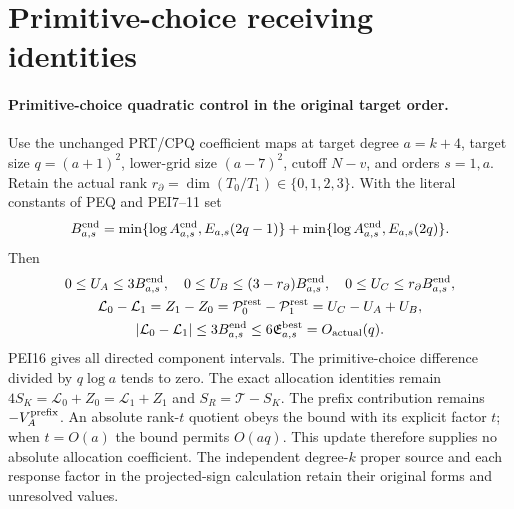 \documentclass[11pt,a4paper]{article}
\begin{document}
\endgroup

\clearpage
\begingroup


\setcounter{equation}{0}
\renewcommand{\theequation}{PEQR.\arabic{equation}}
\section*{Primitive-choice receiving identities}
\paragraph{Primitive-choice quadratic control in the original target order.}
Use the unchanged PRT/CPQ coefficient maps at target degree $a=k+4$,
target size $q=(a+1)^2$, lower-grid size $(a-7)^2$, cutoff $N-v$,
and orders $s=1,a$. Retain the actual rank
$r_\partial=\dim(T_0/T_1)\in\{0,1,2,3\}$.
With the literal constants of PEQ and PEI7--11 set
\[
 B^{\rm end}_{a,s}=
 \min\{\log A^{\rm end}_{a,s},E_{a,s}(2q-1)\}
 +\min\{\log A^{\rm end}_{a,s},E_{a,s}(2q)\}.
\]
Then
\[
 \begin{gathered}
 0\le U_A\le3B^{\rm end}_{a,s},\quad
 0\le U_B\le(3-r_\partial)B^{\rm end}_{a,s},\quad
 0\le U_C\le r_\partial B^{\rm end}_{a,s},\\
 \mathcal L_0-\mathcal L_1=Z_1-Z_0
     =\mathcal P^{\rm rest}_0-\mathcal P^{\rm rest}_1
     =U_C-U_A+U_B,\\
 |\mathcal L_0-\mathcal L_1|
 \le3B^{\rm end}_{a,s}\le6\mathfrak E^{\rm best}_{a,s}
       =O_{\rm actual}(q).
 \end{gathered}
\]
PEI16 gives all directed component intervals. The primitive-choice
difference divided by $q\log a$ tends to zero. The exact allocation
identities remain
$4S_K=\mathcal L_0+Z_0=\mathcal L_1+Z_1$ and
$S_R=\mathcal T-S_K$. The prefix contribution remains
$-V_A^{\rm prefix}$. An absolute rank-$t$ quotient obeys the bound
with its explicit factor $t$; when $t=O(a)$ the bound permits
$O(aq)$. This update therefore supplies no absolute allocation
coefficient. The independent degree-$k$ proper source and each
response factor in the projected-sign calculation retain their
original forms and unresolved values.

\endgroup
\end{document}
